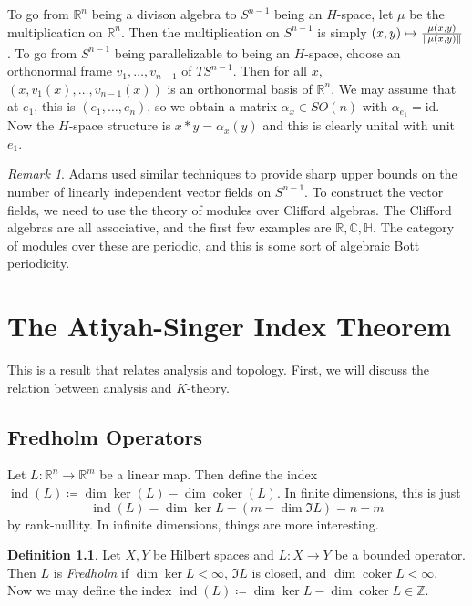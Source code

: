 \documentclass[leqno, openany]{memoir}
\theoremstyle{definition}
\newtheorem{defn}[thm]{Definition}
\theoremstyle{remark}
\newtheorem{rmk}[thm]{Remark}
\theoremstyle{plain}
\theoremstyle{definition}
\theoremstyle{remark}
\newcommand{\R}{\mathbb{R}}
\newcommand{\C}{\mathbb{C}}
\newcommand{\Z}{\mathbb{Z}}
\newcommand{\mr}[1]{\mathrm{#1}}
\DeclareMathOperator{\coker}{coker}
\DeclareMathOperator{\ind}{ind}
\begin{document}
To go from $\R^n$ being a divison algebra to $S^{n-1}$ being an $H$-space, let $\mu$ be the multiplication on $\R^n$. Then the multiplication on $S^{n-1}$ is simply $(x,y) \mapsto \frac{\mu(x,y)}{\norm{\mu(x,y)}}$. To go from $S^{n-1}$ being parallelizable to being an $H$-space, choose an orthonormal frame $v_1, \ldots, v_{n-1}$ of $TS^{n-1}$. Then for all $x$, $(x, v_1(x), \ldots, v_{n-1}(x))$ is an orthonormal basis of $\R^n$. We may assume that at $e_1$, this is $(e_1, \ldots, e_n)$, so we obtain a matrix $\alpha_x \in SO(n)$ with $\alpha_{e_1} = \mr{id}$. Now the $H$-space structure is $x * y = \alpha_x(y)$ and this is clearly unital with unit $e_1$.

\begin{rmk}
    Adams used similar techniques to provide sharp upper bounds on the number of linearly independent vector fields on $S^{n-1}$. To construct the vector fields, we need to use the theory of modules over Clifford algebras. The Clifford algebras are all associative, and the first few examples are $\R, \C, \mathbb{H}$. The category of modules over these are periodic, and this is some sort of algebraic Bott periodicity.
\end{rmk}

\chapter{The Atiyah-Singer Index Theorem}%
\label{cha:the_atiyah_singer_index_theorem}

This is a result that relates analysis and topology. First, we will discuss the relation between analysis and $K$-theory.

\section{Fredholm Operators}%
\label{sec:fredholm_operators}

Let $L \colon \R^n \to \R^m$ be a linear map. Then define the index $\ind(L) \coloneqq \dim \ker (L) - \dim \coker(L)$. In finite dimensions, this is just
\[ \ind(L) = \dim \ker L - (m - \dim \Im L) = n-m \]
by rank-nullity. In infinite dimensions, things are more interesting.

\begin{defn}
    Let $X, Y$ be Hilbert spaces and $L \colon X \to Y$ be a bounded operator. Then $L$ is \textit{Fredholm} if $\dim \ker L < \infty$, $\Im L$ is closed, and $\dim \coker L < \infty$. Now we may define the index $\ind(L) \coloneqq \dim \ker L - \dim \coker L \in \Z$.
\end{defn}
\end{document}
